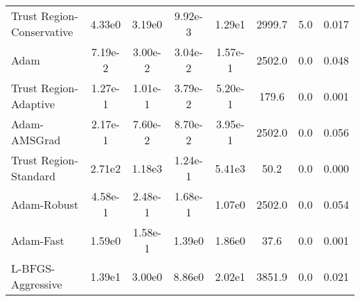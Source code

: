 \documentclass{article}
\begin{document}
\begin{table}[htbp]
{\begin{tabular}{p{2.5cm}*{7}{c}}
Trust Region-Conservative & 4.33e0 & 3.19e0 & 9.92e-3 & 1.29e1 & 2999.7 & 5.0 & 0.017 \\
Adam & 7.19e-2 & 3.00e-2 & 3.04e-2 & 1.57e-1 & 2502.0 & 0.0 & 0.048 \\
Trust Region-Adaptive & 1.27e-1 & 1.01e-1 & 3.79e-2 & 5.20e-1 & 179.6 & 0.0 & 0.001 \\
Adam-AMSGrad & 2.17e-1 & 7.60e-2 & 8.70e-2 & 3.95e-1 & 2502.0 & 0.0 & 0.056 \\
Trust Region-Standard & 2.71e2 & 1.18e3 & 1.24e-1 & 5.41e3 & 50.2 & 0.0 & 0.000 \\
Adam-Robust & 4.58e-1 & 2.48e-1 & 1.68e-1 & 1.07e0 & 2502.0 & 0.0 & 0.054 \\
Adam-Fast & 1.59e0 & 1.58e-1 & 1.39e0 & 1.86e0 & 37.6 & 0.0 & 0.001 \\
L-BFGS-Aggressive & 1.39e1 & 3.00e0 & 8.86e0 & 2.02e1 & 3851.9 & 0.0 & 0.021 \\
\bottomrule
\end{tabular}
}
\end{table}
\end{document}
